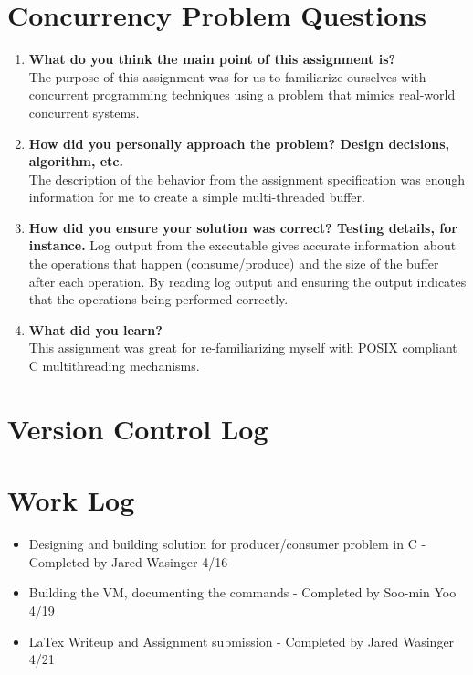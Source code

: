 \documentclass[letterpaper,10pt]{article}
\begin{document}
\section{Concurrency Problem Questions}

\begin{enumerate}
  \item{\textbf{What do you think the main point of this assignment is?}}\\
  The purpose of this assignment was for us to familiarize ourselves with concurrent programming techniques using a problem that mimics real-world concurrent systems.\\
  \item{\textbf{How did you personally approach the problem? Design decisions, algorithm, etc.}}\\
  The description of the behavior from the assignment specification was enough information for me to create a simple multi-threaded buffer.
  \item{\textbf{How did you ensure your solution was correct? Testing details, for instance.}}
  Log output from the executable gives accurate information about the operations that happen (consume/produce) and the size of the buffer after each operation.  By reading log output and ensuring the output indicates that the operations being performed correctly.\\
  \item{\textbf{What did you learn?}}\\
  This assignment was great for re-familiarizing myself with POSIX compliant C multithreading mechanisms.\\
\end{enumerate}
\section{Version Control Log}

\newpage


\section{Work Log}
\begin{itemize}
  \item{Designing and building solution for producer/consumer problem in C - Completed by Jared Wasinger 4/16}
  \item{Building the VM, documenting the commands - Completed by Soo-min Yoo 4/19}
  \item{LaTex Writeup and Assignment submission - Completed by Jared Wasinger 4/21}
\end{itemize}
\end{document}
